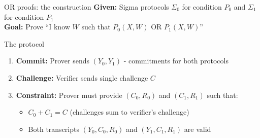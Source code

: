 \documentclass[aspectratio=169, lualatex, handout]{beamer}
\begin{document}
\begin{frame}{OR proofs: the construction}
	\textbf{Given:} Sigma protocols $\Sigma_0$ for condition $P_0$ and $\Sigma_1$ for condition $P_1$\\
	\textbf{Goal:} Prove ``I know $W$ such that $P_0(X,W)$ OR $P_1(X,W)$''
	\vspace{0.5em}
	\begin{block}{The protocol}
		\begin{enumerate}
			\item \textbf{Commit:} Prover sends $(Y_0, Y_1)$ - commitments for both protocols
			\item \textbf{Challenge:} Verifier sends single challenge $C$
			\item \textbf{Constraint:} Prover must provide $(C_0, R_0)$ and $(C_1, R_1)$ such that:
			      \begin{itemize}
				      \item $C_0 + C_1 = C$ (challenges sum to verifier's challenge)
				      \item Both transcripts $(Y_0, C_0, R_0)$ and $(Y_1, C_1, R_1)$ are valid
			      \end{itemize}
		\end{enumerate}
	\end{block}
\end{frame}
\end{document}
